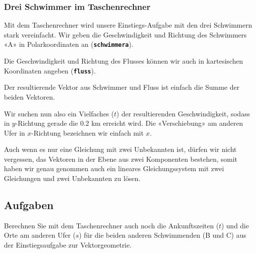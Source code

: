 \subsubsection{Drei Schwimmer im Taschenrechner}
Mit dem Taschenrechner wird unsere Einstiegs-Aufgabe mit den drei
Schwimmern stark vereinfacht. Wir geben die Geschwindigkeit und
Richtung des Schwimmers «A» in Polarkoordinaten an
(\textbf{\texttt{schwimmera}}).

Die Geschwindigkeit und Richtung des Flusses können wir auch in kartesischen
Koordinaten angeben (\texttt{\textbf{fluss}}).

Der resultierende Vektor aus Schwimmer und Fluss ist einfach
die Summe der beiden Vektoren.

Wir suchen nun also ein Vielfaches ($t$) der resultierenden
Geschwindigkeit, sodass in $y$-Richtung gerade die 0.2 km erreicht
wird. Die «Verschiebung» am anderen Ufer in $x$-Richtung bezeichnen
wir einfach mit $x$.


\begin{bemerkung}{}{}
  Auch wenn es nur eine Gleichung mit zwei Unbekannten ist, dürfen wir
  nicht vergessen, das Vektoren in der Ebene aus zwei Komponenten
  bestehen, somit haben wir genau genommen auch ein lineares
  Gleichungssystem mit zwei Gleichungen und zwei Unbekannten zu lösen.
  \end{bemerkung}
\newpage
  
\subsection*{Aufgaben}

Berechnen Sie mit dem Taschenrechner auch noch die Ankunftszeiten ($t$) und die Orte am anderen Ufer
($s$) für die beiden anderen Schwimmenden (B und C) aus der
Einstiegsaufgabe zur Vektorgeometrie.


\newpage
